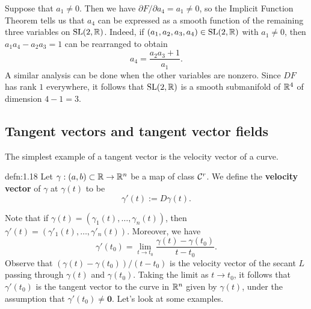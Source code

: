 Suppose that $a_1 \neq 0$. Then we have $\partial F/\partial a_4 = a_1 \neq 0$, 
so the Implicit Function Theorem tells us that $a_4$ can be expressed as a 
smooth function of the remaining three variables on $\operatorname{SL}(2, \mathbb{R})$. Indeed, if 
$(a_1, a_2, a_3, a_4) \in \operatorname{SL}(2, \mathbb{R})$ with $a_1 \neq 0$, then 
$a_1a_4 - a_2a_3 = 1$ can be rearranged to obtain 
\[ a_4 = \frac{a_2a_3 + 1}{a_1}. \] 
A similar analysis can be done when the other variables are nonzero. 
Since $DF$ has rank $1$ everywhere, it follows that $\operatorname{SL}(2, \mathbb{R})$ is a 
smooth submanifold of $\mathbb{R}^4$ of dimension $4-1 = 3$. 

\subsection{Tangent vectors and tangent vector fields} \label{subsec:1.5}
The simplest example of a tangent vector is the velocity vector of a curve. 

\begin{defn}{defn:1.18}
    Let $\gamma : (a, b) \subset \mathbb{R} \to \mathbb{R}^n$ be a map of class ${\cal C}^r$. 
    We define the {\bf velocity vector} of $\gamma$ at $\gamma(t)$ to be 
    \[ \gamma'(t) := D\gamma(t). \] 
\end{defn}\vspace{-0.25cm}

Note that if $\gamma(t) = (\gamma_1(t), \dots, \gamma_n(t))$, then 
$\gamma'(t) = (\gamma'_1(t), \dots, \gamma'_n(t))$. Moreover, we have 
\[ \gamma'(t_0) = \lim_{t\to t_0} \frac{\gamma(t) - \gamma(t_0)}{t - t_0}. \] 
Observe that $(\gamma(t) - \gamma(t_0))/(t - t_0)$ is the velocity vector 
of the secant $L$ passing through $\gamma(t)$ and $\gamma(t_0)$. 
Taking the limit as $t \to t_0$, it follows that $\gamma'(t_0)$ is the tangent 
vector to the curve in $\mathbb{R}^n$ given by $\gamma(t)$, under the assumption
that $\gamma'(t_0) \neq \mathbf 0$. Let's look at some examples. 

